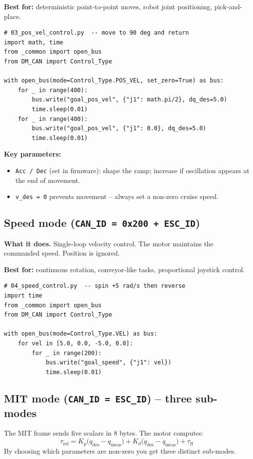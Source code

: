 \documentclass[11pt,a4paper]{article}
\begin{document}
\textbf{Best for:} deterministic point-to-point moves, robot joint positioning,
pick-and-place.

\begin{lstlisting}
# 03_pos_vel_control.py  -- move to 90 deg and return
import math, time
from _common import open_bus
from DM_CAN import Control_Type

with open_bus(mode=Control_Type.POS_VEL, set_zero=True) as bus:
    for _ in range(400):
        bus.write("goal_pos_vel", {"j1": math.pi/2}, dq_des=5.0)
        time.sleep(0.01)
    for _ in range(400):
        bus.write("goal_pos_vel", {"j1": 0.0}, dq_des=5.0)
        time.sleep(0.01)
\end{lstlisting}

\noindent\textbf{Key parameters:}
\begin{itemize}
  \item \texttt{Acc / Dec} (set in firmware): shape the ramp; increase if
        oscillation appears at the end of movement.
  \item \texttt{v\_des = 0} prevents movement -- always set a non-zero cruise speed.
\end{itemize}

\subsection{Speed mode (\texttt{CAN\_ID = 0x200 + ESC\_ID})}
\textbf{What it does.}
Single-loop velocity control.  The motor maintains the commanded speed.
Position is ignored.

\textbf{Best for:} continuous rotation, conveyor-like tasks, proportional
joystick control.

\begin{lstlisting}
# 04_speed_control.py  -- spin +5 rad/s then reverse
import time
from _common import open_bus
from DM_CAN import Control_Type

with open_bus(mode=Control_Type.VEL) as bus:
    for vel in [5.0, 0.0, -5.0, 0.0]:
        for _ in range(200):
            bus.write("goal_speed", {"j1": vel})
            time.sleep(0.01)
\end{lstlisting}

\subsection{MIT mode (\texttt{CAN\_ID = ESC\_ID}) -- three sub-modes}
The MIT frame sends five scalars in 8 bytes.  The motor computes:
\[
\tau_{\text{ref}} = K_p\bigl(q_{\text{des}}-q_{\text{meas}}\bigr)
                  + K_d\bigl(\dot{q}_{\text{des}}-\dot{q}_{\text{meas}}\bigr)
                  + \tau_{\text{ff}}
\]
By choosing which parameters are non-zero you get three distinct sub-modes.
\end{document}
